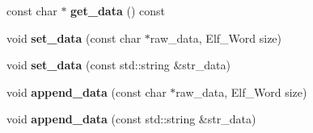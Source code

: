\begin{DoxyCompactItemize}
\item 
const char $\ast$ {\bfseries get\+\_\+data} () const \hypertarget{class_e_l_f_i_o_1_1section__impl_a3d7b791ceaad8836a9f9369d7a691664}{}\label{class_e_l_f_i_o_1_1section__impl_a3d7b791ceaad8836a9f9369d7a691664}

\item 
void {\bfseries set\+\_\+data} (const char $\ast$raw\+\_\+data, Elf\+\_\+\+Word size)\hypertarget{class_e_l_f_i_o_1_1section__impl_ac2218e0bf68642ede15af94b20b2dbcb}{}\label{class_e_l_f_i_o_1_1section__impl_ac2218e0bf68642ede15af94b20b2dbcb}

\item 
void {\bfseries set\+\_\+data} (const std\+::string \&str\+\_\+data)\hypertarget{class_e_l_f_i_o_1_1section__impl_acbf3a7decb8f47965d4d6fd9c849404b}{}\label{class_e_l_f_i_o_1_1section__impl_acbf3a7decb8f47965d4d6fd9c849404b}

\item 
void {\bfseries append\+\_\+data} (const char $\ast$raw\+\_\+data, Elf\+\_\+\+Word size)\hypertarget{class_e_l_f_i_o_1_1section__impl_a03b0a631020f153b7d872a476e48c54c}{}\label{class_e_l_f_i_o_1_1section__impl_a03b0a631020f153b7d872a476e48c54c}

\item 
void {\bfseries append\+\_\+data} (const std\+::string \&str\+\_\+data)\hypertarget{class_e_l_f_i_o_1_1section__impl_a687110e9589863843b6a04188daf6e18}{}\label{class_e_l_f_i_o_1_1section__impl_a687110e9589863843b6a04188daf6e18}

\end{DoxyCompactItemize}
